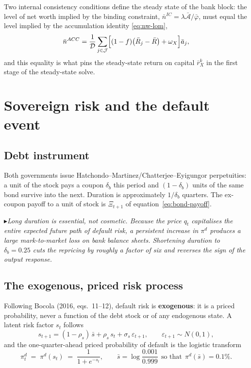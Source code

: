 \documentclass[11pt]{article}
\numberwithin{equation}{section}
\theoremstyle{definition}
\theoremstyle{plain}
\theoremstyle{remark}
\newcommand{\impl}[1]{\par\smallskip\noindent\textcolor{notec}{$\blacktriangleright$}\;\emph{#1}\par\smallskip}
\begin{document}
Two internal consistency conditions define the steady state of the bank block: the
level of net worth implied by the binding constraint,
$\bar n^{IC}=\lambda\bar{\mathcal{A}}/\bar\varphi$, must equal the level implied by the
accumulation identity \eqref{eq:nw-lom},
\begin{equation}
\bar n^{ACC}
=\frac{1}{\mathcal{D}}
 \sum_{j\in\mathcal{J}}\Bigl[(1-f)\bigl(\bar R_{j}-\bar R\bigr)+\omega_X\Bigr]\bar a_j ,
\label{eq:ss-nw}
\end{equation}
and this equality is what pins the steady-state return on capital $\bar r^{k}_X$
in the first stage of the steady-state solve.

\section{Sovereign risk and the default event}
\label{sec:sovrisk}

\subsection{Debt instrument}

Both governments issue Hatchondo--Martinez/Chatterjee--Eyigungor perpetuities: a unit
of the stock pays a coupon $\delta_b$ this period and $(1-\delta_b)$ units of the same
bond survive into the next. Duration is approximately $1/\delta_b$ quarters. The
ex-coupon payoff to a unit of stock is $\Xi_{t+1}$ of equation~\eqref{eq:bond-payoff}.

\impl{Long duration is essential, not cosmetic. Because the price
$q_t$ capitalises the entire expected future path of default risk, a persistent
increase in $\pi^{d}$ produces a large mark-to-market loss on bank balance sheets.
Shortening duration to $\delta_b=0.25$ cuts the repricing by roughly a factor of six
and reverses the sign of the output response.}

\subsection{The exogenous, priced risk process}

Following Bocola (2016, eqs.~11--12), default risk is \textbf{exogenous}: it is a
priced probability, never a function of the debt stock or of any endogenous state.
A latent risk factor $s_t$ follows
\begin{equation}
s_{t+1}=(1-\rho_s)\,\bar s+\rho_s\,s_t+\sigma_s\,\varepsilon_{t+1},
\qquad \varepsilon_{t+1}\sim N(0,1),
\label{eq:s-process}
\end{equation}
and the one-quarter-ahead priced probability of default is the logistic transform
\begin{equation}
\pi^{d}_t\;=\;\pi^{d}(s_t)\;=\;\frac{1}{1+e^{-s_t}},
\qquad \bar s=\log\frac{0.001}{0.999}\ \ \text{so that}\ \ \pi^{d}(\bar s)=0.1\%.
\label{eq:pd}
\end{equation}
\end{document}

